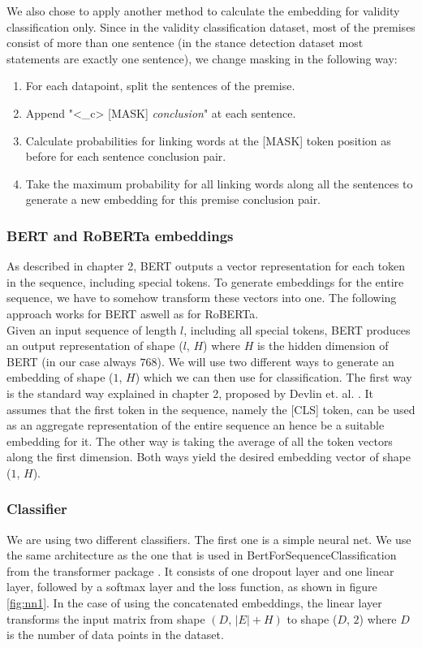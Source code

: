 We also chose to apply another method to calculate the embedding for validity classification only. Since in the validity classification dataset, most of the premises consist of more than one sentence (in the stance detection dataset most statements are exactly one sentence), we change masking in the following way: \\
\begin{enumerate}
	\item For each datapoint, split the sentences of the premise.
	\item Append "<\_c> [MASK] \textit{conclusion}" at each sentence.
	\item Calculate probabilities for linking words at the [MASK] token position as before for each sentence conclusion pair.
	\item Take the maximum probability for all linking words along all the sentences to generate a new embedding for this premise conclusion pair.
\end{enumerate}

\subsubsection{BERT and RoBERTa embeddings} \label{sec:bertembeddings}
As described in chapter 2, BERT outputs a vector representation for each token in the sequence, including special tokens. To generate embeddings for the entire sequence, we have to somehow transform these vectors into one. The following approach works for BERT aswell as for RoBERTa.\\
Given an input sequence of length $l$, including all special tokens, BERT produces an output representation of shape ($l$, $H$) where $H$ is the hidden dimension of BERT (in our case always $768$). We will use two different ways to generate an embedding of shape ($1$, $H$) which we can then use for classification. The first way is the standard way explained in chapter 2, proposed by Devlin et. al. \cite{bert}. It assumes that the first token in the sequence, namely the [CLS] token, can be used as an aggregate representation of the entire sequence an hence be a suitable embedding for it. The other way is taking the average of all the token vectors along the first dimension. Both ways yield the desired embedding vector of shape ($1$, $H$).

\subsubsection{Classifier}
We are using two different classifiers. The first one is a simple neural net. We use the same architecture as the one that is used in BertForSequenceClassification from the transformer package \cite{bertimpl}. It consists of one dropout layer and one linear layer, followed by a softmax layer and the loss function, as shown in figure \ref{fig:nn1}. In the case of using the concatenated embeddings, the linear layer transforms the input matrix from shape $(D, \, |E| + H)$ to shape ($D$, $2$) where $D$ is the number of data points in the dataset. 

